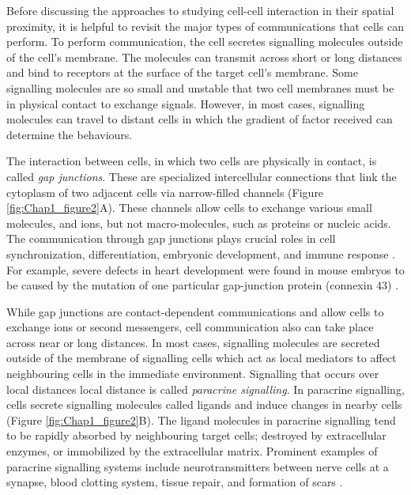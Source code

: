 Before discussing the approaches to studying cell-cell interaction in their spatial proximity, it is helpful to revisit the major types of communications that cells can perform. To perform communication, the cell secretes signalling molecules outside of the cell's membrane. The molecules can transmit across short or long distances and bind to receptors at the surface of the target cell's membrane. Some signalling molecules are so small and unstable that two cell membranes must be in physical contact to exchange signals. However, in most cases, signalling molecules can travel to distant cells in which the gradient of factor received can determine the behaviours.         

The interaction between cells, in which two cells are physically in contact, is called \textit{gap junctions}. These are specialized intercellular connections that link the cytoplasm of two adjacent cells via narrow-filled channels (Figure \ref{fig:Chap1_figure2}A). These channels allow cells to exchange various small molecules, and ions, but not macro-molecules, such as proteins or nucleic acids. The communication through gap junctions plays crucial roles in cell synchronization, differentiation, embryonic development, and immune response \cite{white1999genetic, vinken2006connexins}. For example, severe defects in heart development were found in mouse embryos to be caused by the mutation of one particular gap-junction protein (connexin 43) \cite{alberts2018molecular}.

While gap junctions are contact-dependent communications and allow cells to exchange ions or second messengers, cell communication also can take place across near or long distances. In most cases, signalling molecules are secreted outside of the membrane of signalling cells which act as local mediators to affect neighbouring cells in the immediate environment. Signalling that occurs over local distances local distance is called \textit{paracrine signalling}. In paracrine signalling, cells secrete signalling molecules called ligands and induce changes in nearby cells (Figure \ref{fig:Chap1_figure2}B). The ligand molecules in paracrine signalling tend to be rapidly absorbed by neighbouring target cells; destroyed by extracellular enzymes, or immobilized by the extracellular matrix. Prominent examples of paracrine signalling systems include neurotransmitters between nerve cells at a synapse,  blood clotting system, tissue repair, and formation of scars
\cite{huang1998gap}. 


